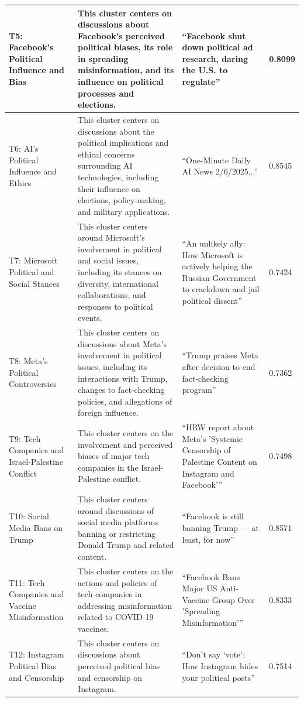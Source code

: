 \begin{longtable}{|p{3cm}|p{5cm}|p{4cm}|p{4cm}|}
\hline
T5: Facebook's Political Influence and Bias & This cluster centers on discussions about Facebook's perceived political biases, its role in spreading misinformation, and its influence on political processes and elections. & “Facebook shut down political ad research, daring the U.S. to regulate” & 0.8099 \\
\hline
T6: AI's Political Influence and Ethics & This cluster centers on discussions about the political implications and ethical concerns surrounding AI technologies, including their influence on elections, policy-making, and military applications. & “One-Minute Daily AI News 2/6/2025...” & 0.8545  \\
\hline
T7: Microsoft Political and Social Stances & This cluster centers around Microsoft's involvement in political and social issues, including its stances on diversity, international collaborations, and responses to political events. & “An unlikely ally: How Microsoft is actively helping the Russian Government to crackdown and jail political dissent” & 0.7424  \\
\hline
T8: Meta's Political Controversies & This cluster centers on discussions about Meta's involvement in political issues, including its interactions with Trump, changes to fact-checking policies, and allegations of foreign influence. & “Trump praises Meta after decision to end fact-checking program” & 0.7362 \\ 
\hline
T9: Tech Companies and Israel-Palestine Conflict & This cluster centers on the involvement and perceived biases of major tech companies in the Israel-Palestine conflict. & “HRW report about Meta's 'Systemic Censorship of Palestine Content on Instagram and Facebook'” & 0.7498 \\
\hline
T10: Social Media Bans on Trump & This cluster centers around discussions of social media platforms banning or restricting Donald Trump and related content. & “Facebook is still banning Trump — at least, for now” & 0.8571\\ 
\hline
T11: Tech Companies and Vaccine Misinformation & This cluster centers on the actions and policies of tech companies in addressing misinformation related to COVID-19 vaccines. & “Facebook Bans Major US Anti-Vaccine Group Over 'Spreading Misinformation'” & 0.8333\\ 
\hline
T12: Instagram Political Bias and Censorship & This cluster centers on discussions about perceived political bias and censorship on Instagram. & “Don’t say ‘vote’: How Instagram hides your political posts” & 0.7514\\ 

\end{longtable}
